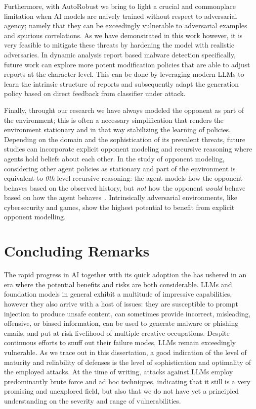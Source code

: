 Furthermore, with AutoRobust we bring to light a crucial and commonplace limitation when AI models are naively trained without respect to adversarial agency; namely that they can be exceedingly vulnerable to adversarial examples and spurious correlations.
As we have demonstrated in this work however, it is very feasible to mitigate these threats by hardening the model with realistic adversaries.
In dynamic analysis report based malware detection specifically, future work can explore more potent modification policies that are able to adjust reports at the character level.
This can be done by leveraging modern LLMs to learn the intrinsic structure of reports and subsequently adapt the generation policy based on direct feedback from classifier under attack.

Finally, throught our research we have always modeled the opponent as part of the environment; this is often a necessary simplification that renders the environment stationary and in that way stabilizing the learning of policies.
Depending on the domain and the sophistication of its prevalent threats, future studies can incorporate explicit opponent modeling and recursive reasoning where agents hold beliefs about each other.
In the study of opponent modeling, considering other agent policies as stationary and part of the environment is equivalent to \textit{0th} level recursive reasoning:
the agent models how the opponent behaves based on the observed history, but \emph{not} how the opponent \emph{would} behave based on how the agent behaves~\cite{albrecht2018autonomous, wen2019probabilistic}.
Intrinsically adversarial environments, like cybersecurity and games, show the highest potential to benefit from explicit opponent modelling.

\section{Concluding Remarks}

The rapid progress in \gls{AI} together with its quick adoption the has ushered in an era where the potential benefits and risks are both considerable.
LLMs and foundation models in general exhibit a multitude of impressive capabilities, however they also arrive with a host of issues: they are susceptible to prompt injection to produce unsafe content, can sometimes provide incorrect, misleading, offensive, or biased information, can be used to generate malware or phishing emails, and put at risk livelihood of multiple creative occupations.
Despite continuous efforts to snuff out their failure modes, LLMs remain exceedingly vulnerable.
As we trace out in this dissertation, a good indication of the level of maturity and reliability of defenses is the level of sophistication and optimality of the employed attacks.
At the time of writing, attacks against LLMs employ predominantly brute force and ad hoc techniques, indicating that it still is a very promising and unexplored field, but also that we do not have yet a principled understanding on the severity and range of vulnerabilities.

